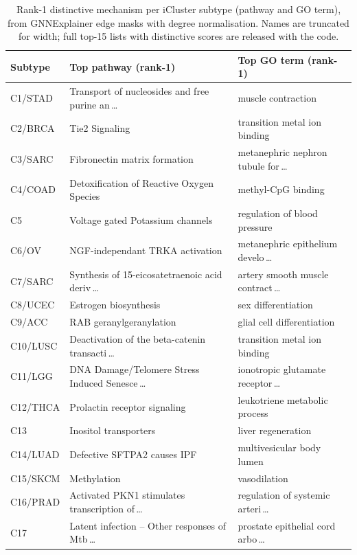 \documentclass[10pt]{article}
\begin{document}
\begin{table}[h]
\centering
\caption{Rank-1 distinctive mechanism per iCluster subtype (pathway and GO
term), from GNNExplainer edge masks with degree normalisation. Names are
truncated for width; full top-15 lists with distinctive scores are released
with the code.}
\label{tab:s_mechanisms}
\footnotesize
\setlength{\tabcolsep}{5pt}
\begin{tabular}{p{1.65cm} p{6.7cm} p{5.85cm}}
\toprule
\textbf{Subtype} & \textbf{Top pathway (rank-1)} & \textbf{Top GO term (rank-1)} \\
\midrule
C1/STAD & Transport of nucleosides and free purine an\,\ldots & muscle contraction \\
C2/BRCA & Tie2 Signaling & transition metal ion binding \\
C3/SARC & Fibronectin matrix formation & metanephric nephron tubule for\,\ldots \\
C4/COAD & Detoxification of Reactive Oxygen Species & methyl-CpG binding \\
C5 & Voltage gated Potassium channels & regulation of blood pressure \\
C6/OV & NGF-independant TRKA activation & metanephric epithelium develo\,\ldots \\
C7/SARC & Synthesis of 15-eicosatetraenoic acid deriv\,\ldots & artery smooth muscle contract\,\ldots \\
C8/UCEC & Estrogen biosynthesis & sex differentiation \\
C9/ACC & RAB geranylgeranylation & glial cell differentiation \\
C10/LUSC & Deactivation of the beta-catenin transacti\,\ldots & transition metal ion binding \\
C11/LGG & DNA Damage/Telomere Stress Induced Senesce\,\ldots & ionotropic glutamate receptor\,\ldots \\
C12/THCA & Prolactin receptor signaling & leukotriene metabolic process \\
C13 & Inositol transporters & liver regeneration \\
C14/LUAD & Defective SFTPA2 causes IPF & multivesicular body lumen \\
C15/SKCM & Methylation & vasodilation \\
C16/PRAD & Activated PKN1 stimulates transcription of\,\ldots & regulation of systemic arteri\,\ldots \\
C17 & Latent infection -- Other responses of Mtb\,\ldots & prostate epithelial cord arbo\,\ldots \\

\end{tabular}
\end{table}
\end{document}

